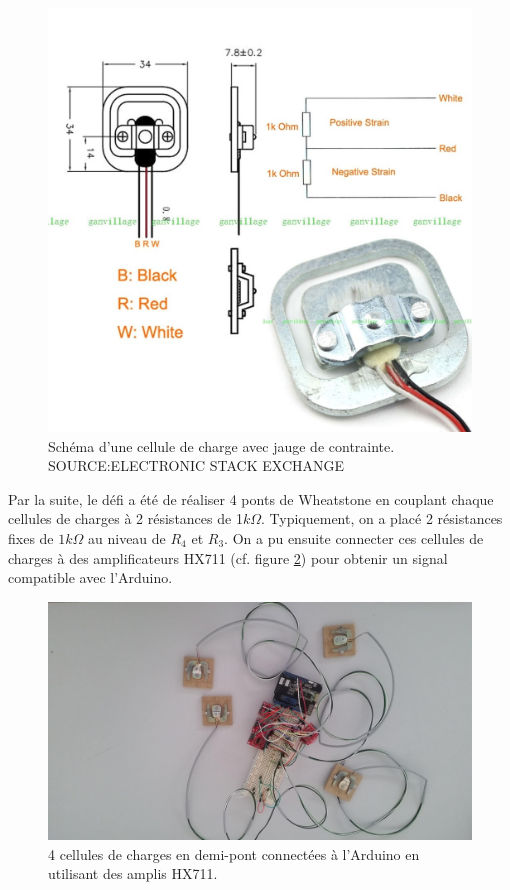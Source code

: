 \documentclass{polytech/polytech}
\begin{document}
\begin{figure}
\begin{center}
\includegraphics[width=12cm]{image/load_sensor.jpg}
\end{center}
\caption{Schéma d'une cellule de charge avec jauge de contrainte. SOURCE:ELECTRONIC STACK EXCHANGE}
\label{fig:load_sensor}
\end{figure}

Par la suite, le défi a été de réaliser 4 ponts de Wheatstone en couplant chaque cellules de charges à 2 résistances de 1$k\Omega$. Typiquement, on a placé 2 résistances fixes de $1k\Omega$ au niveau de $R_4$ et $R_3$.  On a pu ensuite connecter ces cellules de charges à des amplificateurs HX711 (cf. figure \ref{fig:load_sensor_connected}) pour obtenir un signal compatible avec l'Arduino.

\begin{figure}
\begin{center}
\includegraphics[width=12cm]{image/load_sensor_connected.jpg}
\end{center}
\caption{4 cellules de charges en demi-pont connectées à l'Arduino en utilisant des amplis HX711.}
\label{fig:load_sensor_connected}
\end{figure}
\end{document}
